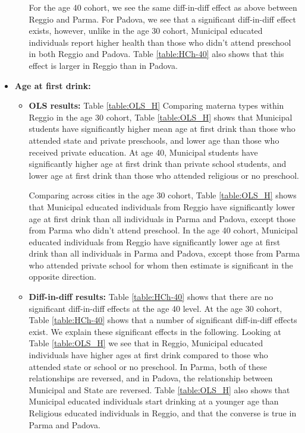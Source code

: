 \documentclass[11pt]{article}
\begin{document}
\begin{itemize}
\begin{itemize}
	For the age 40 cohort, we see the same diff-in-diff effect as above between Reggio and Parma. For Padova, we see that a significant diff-in-diff effect exists, however, unlike in the age 30 cohort, Municipal educated individuals report higher health than those who didn't attend preschool in both Reggio and Padova. Table \ref{table:HCh-40} also shows that this effect is larger in Reggio than in Padova. 
	\end{itemize}

\item \textbf{Age at first drink:} 
	
	\begin{itemize}
	\item \textbf{OLS results:} Table  \ref{table:OLS_H}  Comparing materna types within Reggio in the age 30 cohort, Table \ref{table:OLS_H} shows that Municipal students have significantly higher mean age at first drink than those who attended state and private preschools, and lower age than those who received private education. At age 40, Municipal students have significantly higher age at first drink than private school students, and lower age at first drink than those who attended religious or no preschool.

	Comparing across cities in the age 30 cohort, Table \ref{table:OLS_H} shows that Municipal educated individuals from Reggio have significantly lower age at first drink than all individuals in Parma and Padova, except those from Parma who didn't attend preschool. In the age 40 cohort, Municipal educated individuals from Reggio have significantly lower age at first drink than all individuals in Parma and Padova, except those from Parma who attended private school for whom then estimate is significant in the opposite direction. 
	
	\item \textbf{Diff-in-diff results:} Table \ref{table:HCh-40} shows that there are no significant diff-in-diff effects at the age 40 level. At the age 30 cohort, Table \ref{table:HCh-40} shows that a number of significant diff-in-diff effects exist. We explain these significant effects in the following. Looking at Table \ref{table:OLS_H} we see that in Reggio, Municipal educated individuals have higher ages at first drink compared to those who attended state or school or no preschool. In Parma, both of these relationships are reversed, and in Padova, the relationship between Municipal and State are reversed. Table \ref{table:OLS_H} also shows that Municipal educated individuals start drinking at a younger age than Religious educated individuals in Reggio, and that the converse is true in Parma and Padova.
	\end{itemize}
\end{itemize}
\end{document}
